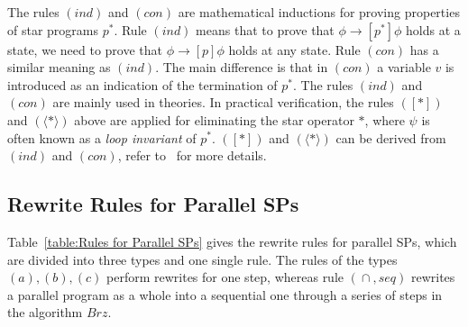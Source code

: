 \documentclass{fcs}
\newcommand{\la}[0]{\langle}
\newcommand{\ra}[0]{\rangle}
\DeclareMathOperator{\para}{\cap}
\newcommand{\ToSeq}[0]{\mathit{Brz}}
\begin{document}
The rules $(\mathit{ind})$ and $(\mathit{con})$ are mathematical inductions for proving properties of star programs $p^*$.
Rule $(\mathit{ind})$ means that to prove that $\phi\to [p^*]\phi$ holds at a state, we need to prove that $\phi\to [p]\phi$ holds at any state.
Rule $(\mathit{con})$ has a similar meaning as $(\mathit{ind})$.
The main difference is that in $(\mathit{con})$ a variable $v$ is introduced as an indication of the termination of $p^*$.
The rules $(\mathit{ind})$ and $(\mathit{con})$ are mainly used in theories.
In practical verification, the rules $([*])$ and $(\la *\ra)$ above are applied for eliminating the star operator $*$, where $\psi$ is often known as a \emph{loop invariant} of $p^*$.
$([*])$ and $(\la *\ra)$ can be derived from $(\mathit{ind})$ and $(\mathit{con})$, refer to~\cite{Harel00} for more details.



\subsection{Rewrite Rules for Parallel SPs}
\label{section:Rewrite Rules for Parallel SPs}

Table~\ref{table:Rules for Parallel SPs} gives the rewrite rules for parallel SPs, which are divided into three types and one single rule.
The rules of the types $(a), (b), (c)$ perform rewrites for one step, whereas rule $(\para, \mathit{seq})$ rewrites a parallel program as a whole into a sequential one through a series of steps in the algorithm $\ToSeq$.
\end{document}
